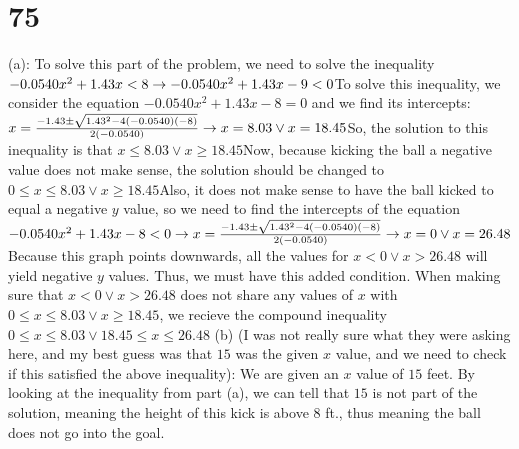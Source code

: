 \documentclass{article}
\theoremstyle{definition}
\begin{document}
\section*{75}
(a): To solve this part of the problem, we need to solve the inequality $-0.0540x^2+1.43x<8\newline\rightarrow 
-0.0540x^2+1.43x-9<0$\newline To solve this inequality, we consider the equation $-0.0540x^2+1.43x-8=0$ and we find its intercepts:\newline 
$x=\frac{-1.43\pm\sqrt{1.43^2-4(-0.0540)(-8)}}{2(-0.0540)}\newline\rightarrow 
x=8.03\vee x=18.45$\newline So, the solution to this inequality is that $x\le 8.03\vee x\ge 18.45$\newline Now, because kicking the ball a negative value 
does not make sense, the solution should be changed to $0\le x\le 8.03\vee x\ge 18.45$\newline Also, it does not make sense to have the ball kicked 
to equal a negative $y$ value, so we need to find the intercepts of the equation $-0.0540x^2+1.43x-8<0\newline\rightarrow 
x=\frac{-1.43\pm\sqrt{1.43^2-4(-0.0540)(-8)}}{2(-0.0540)}\newline\rightarrow 
x=0\vee x=26.48$ Because this graph points downwards, all the values for $x< 0\vee x> 26.48$ will yield negative $y$ values. Thus, we must have this 
added condition. When making sure that $x< 0\vee x> 26.48$ does not share any values of $x$ with $0\le x\le 8.03\vee x\ge 18.45$, we recieve 
the compound inequality $0\le x\le 8.03\vee 18.45\le x\le 26.48$
(b) (I was not really sure what they were asking here, and my best guess was that $15$ was the given $x$ value, and we need to check if this 
satisfied the above inequality): We are given an $x$ value of $15$ feet. By looking at the inequality from part (a), we can tell that $15$ is not 
part of the solution, meaning the height of this kick is above $8$ ft., thus meaning the ball does not go into the goal.
\end{document}
